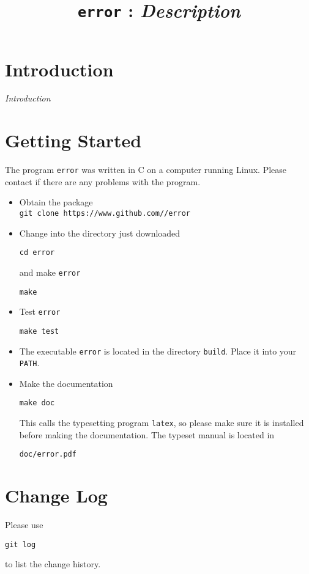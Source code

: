 \documentclass[a4paper, english]{article}
\begin{document}
\title{\texttt{error} : \emph{Description}}
\author{}

\date{}
\maketitle

\section{Introduction} 
\emph{Introduction}

\section{Getting Started}
The program \texttt{error} was written in C on a computer running Linux.
Please contact \texttt{} if there are any problems
with the program.
\begin{itemize}
\item Obtain the package\\
\texttt{git clone https://www.github.com//error}
\item Change into the directory just downloaded
\begin{verbatim}
cd error
\end{verbatim}
and make \texttt{error}
\begin{verbatim}
make
\end{verbatim}
\item Test \texttt{error}
\begin{verbatim}
make test
\end{verbatim}
\item The executable \texttt{error} is located in the
  directory \texttt{build}. Place it into your \texttt{PATH}.
\item Make the documentation
\begin{verbatim}
make doc
\end{verbatim}
This calls the typesetting program \texttt{latex}, so please make sure
it is installed before making the documentation. The typeset manual is
located in
\begin{verbatim}
doc/error.pdf
\end{verbatim}
\end{itemize}

\section{Change Log}
Please use
\begin{verbatim}
git log
\end{verbatim}
to list the change history.

\end{document}
